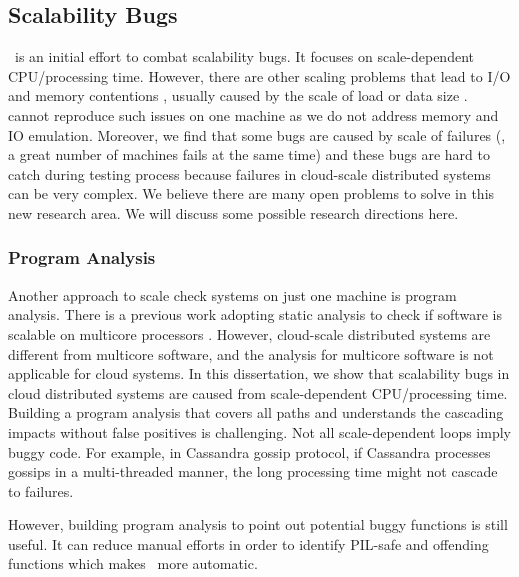 \subsection{Scalability Bugs}


\sck\ is an initial effort to combat scalability bugs. It focuses on
scale-dependent CPU/processing time. However, there are other scaling problems
that lead to I/O and memory contentions \cite{ Gunawi+14-Cbs,
Ousterhout+15-MakingSense, Konstantin+10-HDFSScalability}, usually caused by the
scale of load \cite{Bodik+10-WorkloadSpikes, Guo+13-CureIsWorse} or data size
\cite{Nguyen+16-Yak}.
\sck cannot reproduce such issues on one machine as we do not address memory and
IO emulation.
%
Moreover, we find that some bugs are caused by scale of failures
\cite{Gunawi+14-Cbs} (\eg, a great number of machines fails at the same time)
and these bugs are hard to catch during testing process because failures in
cloud-scale distributed systems can be very complex.
%
We believe there are many open problems to solve in this new research area. We
will discuss some possible research directions here.

\subsubsection{Program Analysis}

Another approach to scale check systems on just one machine is program analysis.
There is a previous work adopting static analysis to check if software is
scalable on multicore processors \cite{Clements+13-Commuter}. However,
cloud-scale distributed systems are different from multicore software, and the
analysis for multicore software is not applicable for cloud systems. In this
dissertation, we show that scalability bugs in cloud distributed systems are
caused from scale-dependent CPU/processing time. Building a program analysis
that covers all paths and understands the cascading impacts without false
positives is challenging.  Not all scale-dependent loops imply buggy code.  For
example, in Cassandra gossip protocol, if Cassandra processes gossips in a
multi-threaded manner, the long processing time might not cascade to failures.

However, building program analysis to point out potential buggy functions is
still useful. It can reduce manual efforts in order to identify PIL-safe and
offending functions which makes \sck\ more automatic.

